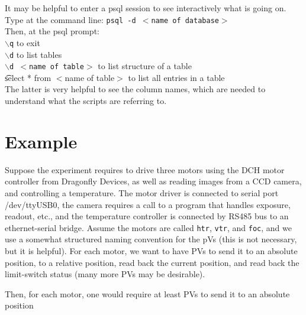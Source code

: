 \documentclass[10pt]{revtex4}
\begin{document}
\par
It may be helpful to enter a psql session to see interactively what
is going on.
Type at the command line: {\tt psql -d $<$name of database$>$}\\
Then, at the psql prompt:\\
{\tt $\backslash$q} to exit\\
{\tt $\backslash$d} to list tables\\
{\tt $\backslash$d $<$name of table$>$} to list structure of a table\\
{\t select * from $<$name of table$>$} to list all entries in a table\\
The latter is very helpful to see the column names, which are needed
to understand what the scripts are referring to.
\section{Example}
Suppose the experiment requires to drive three motors using the
DCH motor controller from Dragonfly Devices, as well as reading
images from a CCD camera, and controlling a temperature.
The motor driver is connected to serial port /dev/ttyUSB0,
the camera requires a call to a program that handles exposure,
readout, etc., and the temperature controller is connected by RS485 bus
to an ethernet-serial bridge.
Assume the motors are called {\tt htr}, {\tt vtr}, and {\tt foc},
and we use a somewhat structured naming convention for the pVs (this
is not necessary, but it is helpful).
For each motor, we want to have PVs to send it to an absolute position,
to a relative position, read back the current position, and read back
the limit-switch status (many more PVs may be desirable).

Then, for each motor, one would require at least PVs to send it to an
absolute position


%

\end{document}

